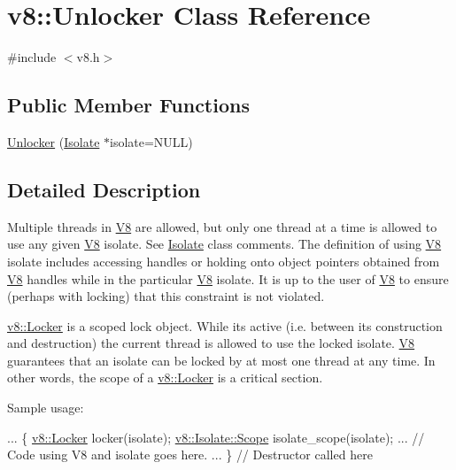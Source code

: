\hypertarget{classv8_1_1_unlocker}{}\section{v8\+:\+:Unlocker Class Reference}
\label{classv8_1_1_unlocker}


{\ttfamily \#include $<$v8.\+h$>$}

\subsection*{Public Member Functions}
\begin{DoxyCompactItemize}
\item 
\hyperlink{classv8_1_1_unlocker_a1512a9d4ecd680f2176fea176052256f}{Unlocker} (\hyperlink{classv8_1_1_isolate}{Isolate} $\ast$isolate=N\+U\+L\+L)
\end{DoxyCompactItemize}


\subsection{Detailed Description}
Multiple threads in \hyperlink{classv8_1_1_v8}{V8} are allowed, but only one thread at a time is allowed to use any given \hyperlink{classv8_1_1_v8}{V8} isolate. See \hyperlink{classv8_1_1_isolate}{Isolate} class comments. The definition of \textquotesingle{}using \hyperlink{classv8_1_1_v8}{V8} isolate\textquotesingle{} includes accessing handles or holding onto object pointers obtained from \hyperlink{classv8_1_1_v8}{V8} handles while in the particular \hyperlink{classv8_1_1_v8}{V8} isolate. It is up to the user of \hyperlink{classv8_1_1_v8}{V8} to ensure (perhaps with locking) that this constraint is not violated.

\hyperlink{classv8_1_1_locker}{v8\+::\+Locker} is a scoped lock object. While it\textquotesingle{}s active (i.\+e. between its construction and destruction) the current thread is allowed to use the locked isolate. \hyperlink{classv8_1_1_v8}{V8} guarantees that an isolate can be locked by at most one thread at any time. In other words, the scope of a \hyperlink{classv8_1_1_locker}{v8\+::\+Locker} is a critical section.

Sample usage\+: 
\begin{DoxyCode}
...
\{
  \hyperlink{classv8_1_1_locker}{v8::Locker} locker(isolate);
  \hyperlink{classv8_1_1_isolate_1_1_scope}{v8::Isolate::Scope} isolate\_scope(isolate);
  ...
  \textcolor{comment}{// Code using V8 and isolate goes here.}
  ...
\} \textcolor{comment}{// Destructor called here}
\end{DoxyCode}


